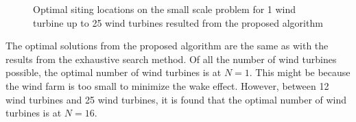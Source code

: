 \begin{figure}[h]
        \qquad
        \caption{Optimal siting locations on the small scale problem for 1 wind turbine up to 25 wind turbines resulted from the proposed algorithm}
        \label{resultsSmallFig}
    \end{figure}
    
    The optimal solutions from the proposed algorithm are the same as with the results from the exhaustive search method. Of all the number of wind turbines possible, the optimal number of wind turbines is at $N=1$. This might be because the wind farm is too small to minimize the wake effect. However, between 12 wind turbines and 25 wind turbines, it is found that the optimal number of wind turbines is at $N=16$.